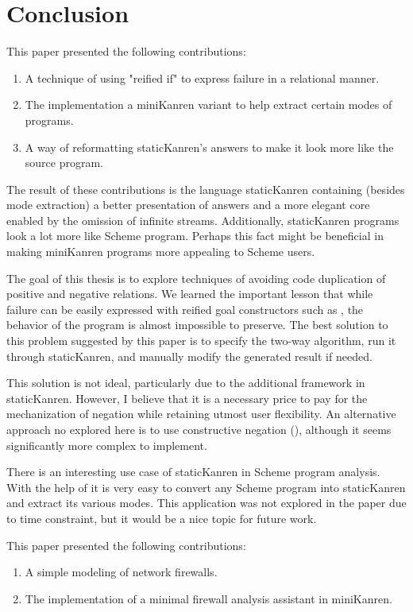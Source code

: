 \section{Conclusion}
\ifthesis
This paper presented the following contributions:
\begin{enumerate}
\item A technique of using "reified if" to express failure in a relational manner.
\item The implementation a miniKanren variant to help extract certain modes of programs.
\item A way of reformatting staticKanren's answers to make it look more like the source program.
\end{enumerate}
The result of these contributions is the language staticKanren containing (besides mode extraction) a better presentation of answers and a more elegant core enabled by the omission of infinite streams. Additionally, staticKanren programs look a lot more like Scheme program. Perhaps this fact might be beneficial in making miniKanren programs more appealing to Scheme users.

The goal of this thesis is to explore techniques of avoiding code duplication of positive and negative relations. We learned the important lesson that while failure can be easily expressed with reified goal constructors such as , the behavior of the program is almost impossible to preserve. The best solution to this problem suggested by this paper is to specify the two-way algorithm, run it through staticKanren, and manually modify the generated result if needed.

This solution is not ideal, particularly due to the additional framework in staticKanren. However, I believe that it is a necessary price to pay for the mechanization of negation while retaining utmost user flexibility. An alternative approach no explored here is to use constructive negation (\cite{chan}), although it seems significantly more complex to implement.

There is an interesting use case of staticKanren in Scheme program analysis. With the help of  it is very easy to convert any Scheme program into staticKanren and extract its various modes. This application was not explored in the paper due to time constraint, but it would be a nice topic for future work.

\else
This paper presented the following contributions:
\begin{enumerate}
\item A simple modeling of network firewalls.
\item The implementation of a minimal firewall analysis assistant in miniKanren.
\end{enumerate}

